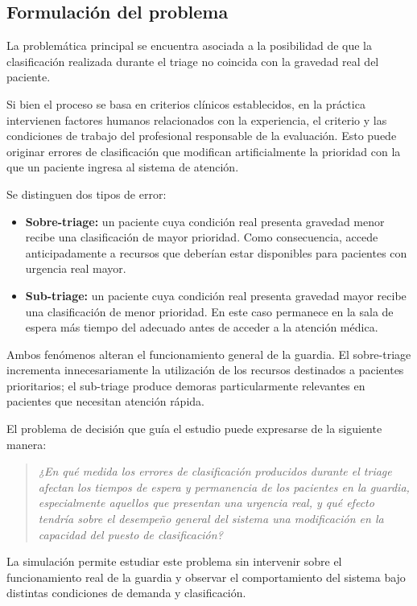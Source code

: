 \documentclass{article}
\begin{document}
\subsection{Formulación del problema}

La problemática principal se encuentra asociada a la posibilidad de que la
clasificación realizada durante el triage no coincida con la gravedad real
del paciente.

Si bien el proceso se basa en criterios clínicos establecidos, en la práctica
intervienen factores humanos relacionados con la experiencia, el criterio y
las condiciones de trabajo del profesional responsable de la evaluación. Esto
puede originar errores de clasificación que modifican artificialmente la
prioridad con la que un paciente ingresa al sistema de atención.

Se distinguen dos tipos de error:

\begin{itemize}
  \item \textbf{Sobre-triage:} un paciente cuya condición real presenta
  gravedad menor recibe una clasificación de mayor prioridad. Como
  consecuencia, accede anticipadamente a recursos que deberían estar
  disponibles para pacientes con urgencia real mayor.
  \item \textbf{Sub-triage:} un paciente cuya condición real presenta
  gravedad mayor recibe una clasificación de menor prioridad. En este caso
  permanece en la sala de espera más tiempo del adecuado antes de acceder a
  la atención médica.
\end{itemize}

Ambos fenómenos alteran el funcionamiento general de la guardia. El
sobre-triage incrementa innecesariamente la utilización de los recursos
destinados a pacientes prioritarios; el sub-triage produce demoras
particularmente relevantes en pacientes que necesitan atención rápida.

El problema de decisión que guía el estudio puede expresarse de la siguiente
manera:

\begin{quote}
\textit{¿En qué medida los errores de clasificación producidos durante el
triage afectan los tiempos de espera y permanencia de los pacientes en la
guardia, especialmente aquellos que presentan una urgencia real, y qué efecto
tendría sobre el desempeño general del sistema una modificación en la
capacidad del puesto de clasificación?}
\end{quote}

La simulación permite estudiar este problema sin intervenir sobre el
funcionamiento real de la guardia y observar el comportamiento del sistema
bajo distintas condiciones de demanda y clasificación.
\end{document}
